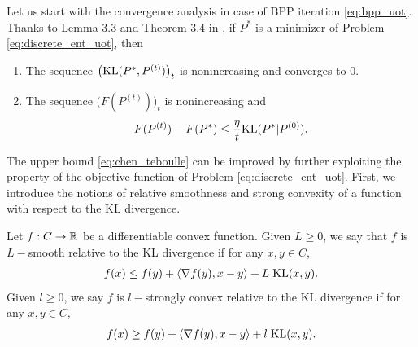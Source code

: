 Let us start with the convergence analysis in case of BPP iteration \ref{eq:bpp_uot}.
Thanks to Lemma 3.3 and Theorem 3.4 in \citep{Chen93}, if $P^*$ is a minimizer of
Problem \eqref{eq:discrete_ent_uot}, then
\begin{enumerate}
  \item The sequence $\big( \text{KL}(P^*, P^{(t)}) \big)_t$ is nonincreasing and converges to $0$.
  \item The sequence $\big( F(P^{(t)}) \big)_t$ is nonincreasing and
  \begin{align}
    \label{eq:chen_teboulle}
    F(P^{(t)}) - F(P^*) \leq \frac{\eta}{t} \text{KL}(P^* | P^{(0)}).
  \end{align}
\end{enumerate}
The upper bound \eqref{eq:chen_teboulle} can be improved by further exploiting the property of
the objective function of Problem \eqref{eq:discrete_ent_uot}.
First, we introduce the notions of relative smoothness \citep{Bauschke17} and
strong convexity \citep{Lu18} of a function with respect to the KL divergence.
\begin{definition}
  \label{def:smooth-convex}
  Let $f:C \to \mathbb R$ be a differentiable convex function.
  Given $L \geq 0$, we say that $f$ is $L-$smooth relative to the KL divergence
  if for any $x, y \in C$,
  \begin{align}
    f(x) \leq f(y) + \langle \nabla f(y), x - y \rangle + L \; \text{KL}(x, y).
  \end{align}
  Given $l \geq 0$, we say $f$ is $l-$strongly convex relative to the KL divergence
  if for any $x, y \in C$,
  \begin{align}
    f(x) \geq f(y) + \langle \nabla f(y), x - y \rangle + l\; \text{KL}(x, y).
  \end{align}
\end{definition}


